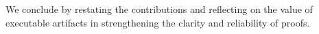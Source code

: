 We conclude by restating the contributions and reflecting on the value of executable artifacts in strengthening the clarity and reliability of proofs.

